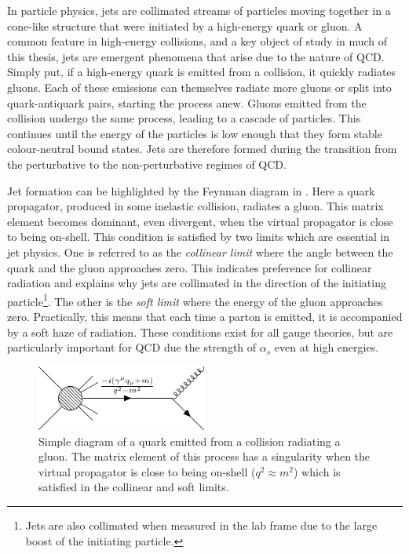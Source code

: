 In particle physics, jets are collimated streams of particles moving together in a cone-like structure that were initiated by a high-energy quark or gluon.
A common feature in high-energy collisions, and a key object of study in much of this thesis, jets are emergent phenomena that arise due to the nature of QCD\@.
Simply put, if a high-energy quark is emitted from a collision, it quickly radiates gluons.
Each of these emissions can themselves radiate more gluons or split into quark-antiquark pairs, starting the process anew.
Gluons emitted from the collision undergo the same process, leading to a cascade of particles.
This continues until the energy of the particles is low enough that they form stable colour-neutral bound states.
Jets are therefore formed during the transition from the perturbative to the non-perturbative regimes of QCD.

Jet formation can be highlighted by the Feynman diagram in .
Here a quark propagator, produced in some inelastic collision, radiates a gluon.
This matrix element becomes dominant, even divergent, when the virtual propagator is close to being on-shell.
This condition is satisfied by two limits which are essential in jet physics.
One is referred to as the \textit{collinear limit} where the angle between the quark and the gluon approaches zero.
This indicates preference for collinear radiation and explains why jets are collimated in the direction of the initiating particle\footnote{Jets are also collimated when measured in the lab frame due to the large boost of the initiating particle.}.
The other is the \textit{soft limit} where the energy of the gluon approaches zero.
Practically, this means that each time a parton is emitted, it is accompanied by a soft haze of radiation.
These conditions exist for all gauge theories, but are particularly important for QCD due the strength of $\alpha_s$ even at high energies.

\begin{figure}[h]
    \centering
    \includegraphics[width=0.5\textwidth]{Feynman/quark_gluon.pdf}
    \caption{Simple diagram of a quark emitted from a collision radiating a gluon. The matrix element of this process has a singularity when the virtual propagator is close to being on-shell ($q^2\approx m^2$) which is satisfied in the collinear and soft limits.}
    \label{fig:quark_gluon}
\end{figure}

